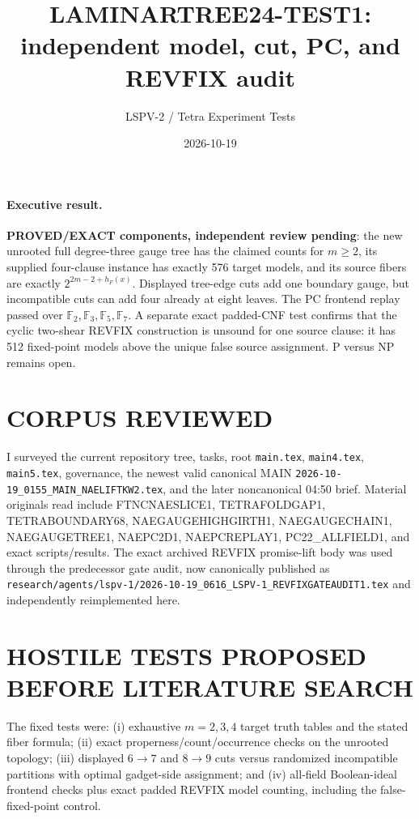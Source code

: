\documentclass[11pt]{article}
\title{LAMINARTREE24-TEST1: independent model, cut, PC, and REVFIX audit}
\author{LSPV-2 / Tetra Experiment Tests}
\date{2026-10-19}
\newcommand{\status}[1]{\textbf{#1}}
\begin{document}
\maketitle

\paragraph{Executive result.}
\status{PROVED/EXACT components, independent review pending}: the new unrooted full degree-three gauge tree has the claimed counts for $m\ge2$, its supplied four-clause instance has exactly 576 target models, and its source fibers are exactly $2^{2m-2+h_F(x)}$.  Displayed tree-edge cuts add one boundary gauge, but incompatible cuts can add four already at eight leaves.  The PC frontend replay passed over $\mathbb F_2,\mathbb F_3,\mathbb F_5,\mathbb F_7$.  A separate exact padded-CNF test confirms that the cyclic two-shear REVFIX construction is unsound for one source clause: it has 512 fixed-point models above the unique false source assignment.  P versus NP remains open.

\section*{CORPUS REVIEWED}
I surveyed the current repository tree, tasks, root \texttt{main.tex}, \texttt{main4.tex}, \texttt{main5.tex}, governance, the newest valid canonical MAIN \texttt{2026-10-19\_0155\_MAIN\_NAELIFTKW2.tex}, and the later noncanonical 04:50 brief.  Material originals read include FTNCNAESLICE1, TETRAFOLDGAP1, TETRABOUNDARY68, NAEGAUGEHIGHGIRTH1, NAEGAUGECHAIN1, NAEGAUGETREE1, NAEPC2D1, NAEPCREPLAY1, PC22\_ALLFIELD1, and exact scripts/results.  The exact archived REVFIX promise-lift body was used through the predecessor gate audit, now canonically published as \texttt{research/agents/lspv-1/2026-10-19\_0616\_LSPV-1\_REVFIXGATEAUDIT1.tex} and independently reimplemented here.

\section*{HOSTILE TESTS PROPOSED BEFORE LITERATURE SEARCH}
The fixed tests were: (i) exhaustive $m=2,3,4$ target truth tables and the stated fiber formula; (ii) exact properness/count/occurrence checks on the unrooted topology; (iii) displayed $6\to7$ and $8\to9$ cuts versus randomized incompatible partitions with optimal gadget-side assignment; and (iv) all-field Boolean-ideal frontend checks plus exact padded REVFIX model counting, including the false-fixed-point control.
\end{document}
